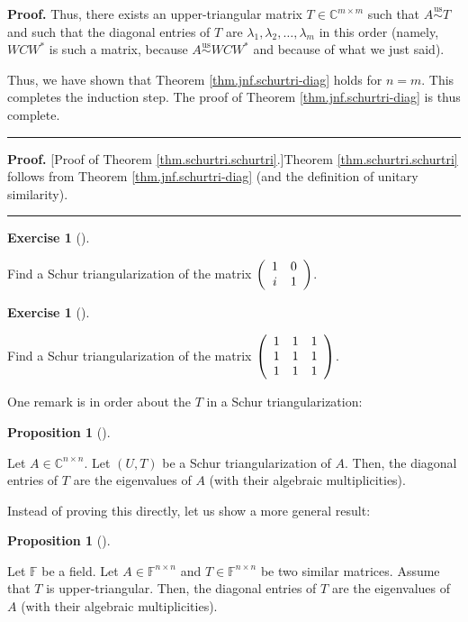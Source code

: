 \documentclass[numbers=enddot,12pt,final,onecolumn,notitlepage]{scrartcl}%
\newcounter{exer}
\numberwithin{exer}{subsection}
\theoremstyle{definition}
\newtheorem{prop}[theo]{Proposition}
\newenvironment{proposition}[1][]
{\begin{prop}[#1]\begin{leftbar}}
{\end{leftbar}\end{prop}}
\newtheorem{exmp}[exer]{Exercise}
\newenvironment{exercise}[1][]
{\begin{exmp}[#1]\begin{leftbar}}
{\end{leftbar}\end{exmp}}
\newenvironment{proof}[1][Proof]{\noindent\textbf{#1.} }{\ \rule{0.5em}{0.5em}}
\begin{document}
\begin{proof}
Thus, there exists an upper-triangular matrix $T\in\mathbb{C}^{m\times m}$
such that $A\overset{\operatorname*{us}}{\sim}T$ and such that the diagonal
entries of $T$ are $\lambda_{1},\lambda_{2},\ldots,\lambda_{m}$ in this order
(namely, $WCW^{\ast}$ is such a matrix, because $A\overset{\operatorname*{us}%
}{\sim}WCW^{\ast}$ and because of what we just said).

Thus, we have shown that Theorem \ref{thm.jnf.schurtri-diag} holds for $n=m$.
This completes the induction step. The proof of Theorem
\ref{thm.jnf.schurtri-diag} is thus complete.
\end{proof}

\begin{proof}
[Proof of Theorem \ref{thm.schurtri.schurtri}.]Theorem
\ref{thm.schurtri.schurtri} follows from Theorem \ref{thm.jnf.schurtri-diag}
(and the definition of unitary similarity).
\end{proof}

\begin{exercise}
\label{exe.schurtri.schurtri.one2x2} Find a Schur triangularization of
the matrix $\left(
\begin{array}
[c]{cc}%
1 & 0\\
i & 1
\end{array}
\right)  $.
\end{exercise}

\begin{exercise}
\label{exe.schurtri.schurtri.one3x3} Find a Schur triangularization of
the matrix $\left(
\begin{array}
[c]{ccc}%
1 & 1 & 1\\
1 & 1 & 1\\
1 & 1 & 1
\end{array}
\right)  $.
\end{exercise}

One remark is in order about the $T$ in a Schur triangularization:

\begin{proposition}
\label{prop.schurtri.schurtri.T-diag}Let $A\in\mathbb{C}^{n\times n}$. Let
$\left(  U,T\right)  $ be a Schur triangularization of $A$. Then, the diagonal
entries of $T$ are the eigenvalues of $A$ (with their algebraic multiplicities).
\end{proposition}

Instead of proving this directly, let us show a more general result:

\begin{proposition}
\label{prop.schurtri.similar.T-diag}Let $\mathbb{F}$ be a field. Let
$A\in\mathbb{F}^{n\times n}$ and $T\in\mathbb{F}^{n\times n}$ be two similar
matrices. Assume that $T$ is upper-triangular. Then, the diagonal entries of
$T$ are the eigenvalues of $A$ (with their algebraic multiplicities).
\end{proposition}
\end{document}
